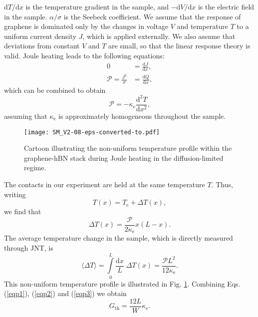 \documentclass[10pt, oneside]{book}
\begin{document}
\begin{doublespace}
\begin{appendix}
 $\mathrm{d}T/\mathrm{d}x$ is the temperature gradient in the sample,  and $-\mathrm{d}V/\mathrm{d}x$ is the electric field in the sample.  $\alpha/\sigma$ is the Seebeck coefficient.  We assume that the response of graphene is dominated only by the changes in voltage $V$ and temperature $T$ to a uniform current density $J$, which is applied externally.  We also assume that deviations from constant $V$ and $T$ are small, so that the linear response theory is valid.  Joule heating leads to the following equations: \begin{subequations}\begin{align}
0 &= \frac{\mathrm{d}J}{\mathrm{d}x}, \\
\mathcal{P} = \frac{J^2}{\sigma} &=  \frac{\mathrm{d}Q}{\mathrm{d}x},
\end{align}\end{subequations}which can be combined to obtain \begin{equation}
\mathcal{P} = -\kappa_{\mathrm{e}} \frac{\mathrm{d}^2 T}{\mathrm{d}x^2},
\end{equation}
assuming that $\kappa_{\mathrm{e}}$ is approximately homogeneous throughout the sample.  


 \begin{figure}
 \centering
\texttt{[image: SM\_V2-08-eps-converted-to.pdf]}
\caption{Cartoon illustrating the non-uniform temperature profile within the graphene-hBN stack during Joule heating in the diffusion-limited regime.}
\label{figs7}
\end{figure}

The contacts in our experiment are held at the same temperature $T$.   Thus, writing \begin{equation}
T(x) = T_{\mathrm{e}} + \Delta T(x),
\end{equation}we find that \begin{equation}
\Delta T(x) = \frac{\mathcal{P}}{2\kappa_{\mathrm{e}}}x(L-x).  
\end{equation}
The average temperature change in the sample, which is directly measured through JNT, is \begin{equation}
\langle \Delta T\rangle = \int\limits_0^L \frac{\mathrm{d}x}{L}\; \Delta T(x)  = \frac{\mathcal{P}L^2}{12\kappa_{\mathrm{e}}}.  \label{eqp3}
\end{equation}
This non-uniform temperature profile is illustrated in Fig. \ref{figs7}.   Combining Eqs. (\ref{eqp1}), (\ref{eqp2}) and (\ref{eqp3}) we obtain \begin{equation}
G_{\mathrm{th}} = \frac{12L}{W} \kappa_{\mathrm{e}}.
\end{equation}


\end{appendix}
\end{doublespace}
\end{document}
